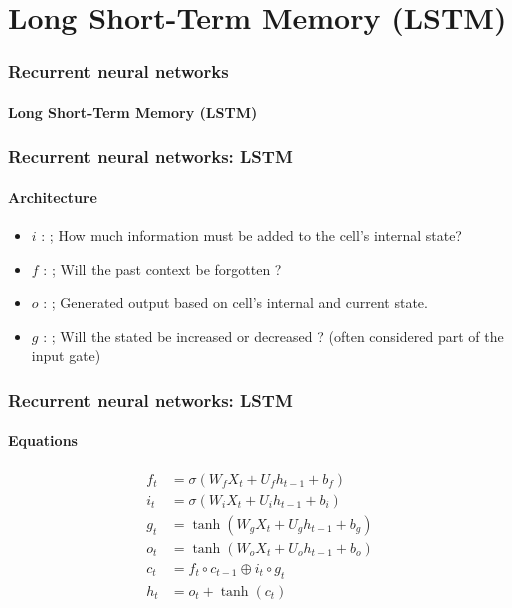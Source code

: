 \documentclass[xcolor=table]{beamer}
\begin{document}
\section{Long Short-Term Memory (LSTM)}

\begin{frame}
	\frametitle{Recurrent neural networks}
	\framesubtitle{Long Short-Term Memory (LSTM)}
\end{frame}

\begin{frame}
	\frametitle{Recurrent neural networks: LSTM}
	\framesubtitle{Architecture}

\begin{minipage}{0.50\textwidth} 
	\begin{itemize}
		\item $i$ :  ;
		How much information must be added to the cell's internal state?
		\item $f$ :  ;
		Will the past context be forgotten ?
		\item $o$ :  ;
		Generated output based on cell's internal and current state.	
	\end{itemize}
\end{minipage}
%
\begin{minipage}{0.49\textwidth}
\end{minipage}

\begin{itemize}
	\item $g$ :  ;
	Will the stated be increased or decreased ?
	(often considered part of the input gate)
\end{itemize}

\end{frame}

\begin{frame}
	\frametitle{Recurrent neural networks: LSTM}
	\framesubtitle{Equations}
	
	\begin{align*}
	f_t &= \sigma(W_f X_t + U_f h_{t-1} + b_f) \\
	i_t &= \sigma(W_i X_t + U_i h_{t-1} + b_i) \\
	g_t &= \tanh(W_g X_t + U_g h_{t-1} + b_g) \\
	o_t &= \tanh(W_o X_t + U_o h_{t-1} + b_o) \\
	c_t &= f_t \circ c_{t-1} \oplus i_t \circ g_t \\
	h_t &= o_t + \tanh(c_t)
	\end{align*}
	
\end{frame}
\end{document}
